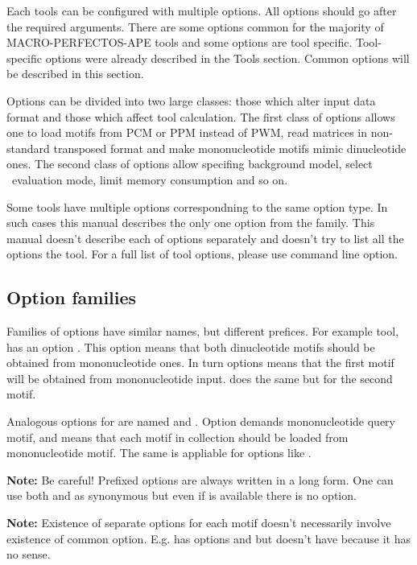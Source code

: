 Each tools can be configured with multiple options. All options should go after the required arguments. There are some options common for the majority of MACRO-PERFECTOS-APE tools and some options are tool specific. Tool-specific options were already described in the Tools section. Common options will  be described in this section.

Options can be divided into two large classes: those which alter input data format and those which affect tool calculation. The first class of options allows one to load motifs from PCM or PPM instead of PWM, read matrices in non-standard transposed format and make mononucleotide motifs mimic dinucleotide ones. The second class of options allow specifing background model, select \pvalue\ evaluation mode, limit memory consumption and so on.

Some tools have multiple options correspondning to the same option type. In such cases this manual describes the only one option from the family. This manual doesn't describe each of options separately and doesn't try to list all the options the tool. For a full list of tool options, please use  command line option.

\subsection{Option families}
{\small
Families of options have similar names, but different prefices. For example  tool, has an option . This option means that both dinucleotide motifs should be obtained from mononucleotide ones. In turn  options means that the first motif will be obtained from mononucleotide input.  does the same but for the second motif.

Analogous options for  are named  and . Option  demands mononucleotide query motif, and  means that each motif in collection should be loaded from mononucleotide motif. The same is appliable for options like .

\textbf{Note:} Be careful! Prefixed options are always written in a long form. One can use both  and  as synonymous but even if  is available there is no  option.

\textbf{Note:} Existence of separate options for each motif doesn't necessarily involve existence of common option. E.g.  has options  and  but doesn't have  because it has no sense.
}
